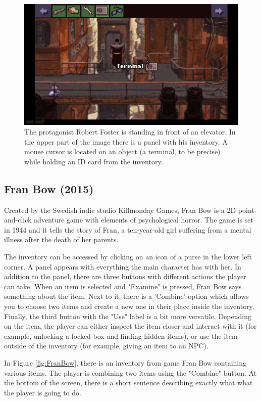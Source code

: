 \begin{figure}[H]
\centering
\includegraphics[width=1.\linewidth]{img/BaSS.png}
\caption{The protagonist Robert Foster is standing in front of an elevator. In the upper part of the image there is a panel with his inventory. A mouse cursor is located on an object (a terminal, to be precise) while holding an ID card from the inventory.}
\label{fig:BaSS}
\end{figure}

\subsection{Fran Bow (2015)}
Created by the Swedish indie studio Killmonday Games, Fran Bow is a 2D point-and-click adventure game with elements of psychological horror. The game is set in 1944 and it tells the story of Fran, a ten-year-old girl suffering from a mental illness after the death of her parents.

The inventory can be accessed by clicking on an icon of a purse in the lower left corner. A panel appears with everything the main character has with her. In addition to the panel, there are three buttons with different actions the player can take. When an item is selected and "Examine" is pressed, Fran Bow says something about the item. Next to it, there is a 'Combine' option which allows you to choose two items and create a new one in their place inside the inventory. Finally, the third button with the "Use" label is a bit more versatile. Depending on the item, the player can either inspect the item closer and interact with it (for example, unlocking a locked box and finding hidden items), or use the item outside of the inventory (for example, giving an item to an NPC).

In Figure \ref{fig:FranBow}, there is an inventory from game Fran Bow containing various items. The player is combining two items using the "Combine" button. At the bottom of the screen, there is a short sentence describing exactly what what the player is going to do.

